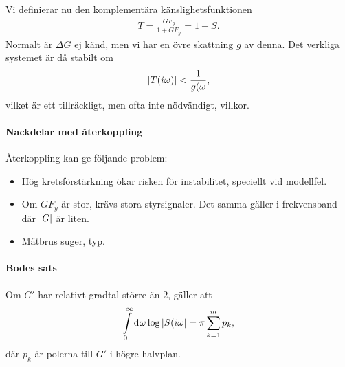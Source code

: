 Vi definierar nu den komplementära känslighetsfunktionen
\begin{align*}
	T = \frac{GF_{y}}{1 + GF_{y}} = 1 - S.
\end{align*}
Normalt är $\Delta G$ ej känd, men vi har en övre skattning $g$ av denna. Det verkliga systemet är då stabilt om
\begin{align*}
	\abs{T(i\omega)} < \frac{1}{g(\omega},
\end{align*}
vilket är ett tillräckligt, men ofta inte nödvändigt, villkor.

\paragraph{Nackdelar med återkoppling}
Återkoppling kan ge följande problem:
\begin{itemize}
	\item Hög kretsförstärkning ökar risken för instabilitet, speciellt vid modellfel.
	\item Om $GF_{y}$ är stor, krävs stora styrsignaler. Det samma gäller i frekvensband där $\abs{G}$ är liten.
	\item Mätbrus suger, typ.
\end{itemize}

\paragraph{Bodes sats}
Om $G'$ har relativt gradtal större än $2$, gäller att
\begin{align*}
	\int\limits_{0}^{\infty}\dd[]{\omega}\log{\abs{S(i\omega}} = \pi\sum\limits_{k = 1}^{m}p_{k},
\end{align*}
där $p_{k}$ är polerna till $G'$ i högre halvplan.